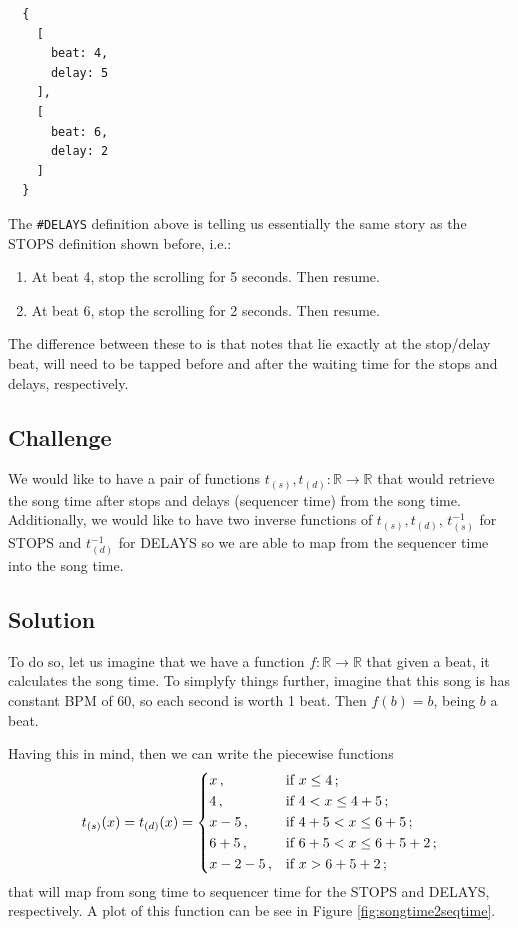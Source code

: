 \documentclass[a4paper,9pt]{article}
\begin{document}
    \begin{verbatim}
  {
    [
      beat: 4,
      delay: 5 
    ],
    [
      beat: 6,
      delay: 2 
    ]
  }
    \end{verbatim}
    The \texttt{\#DELAYS} definition above is telling us essentially the same story as the STOPS definition shown before, i.e.: 
    \begin{enumerate}
	    \item At beat 4, stop the scrolling for 5 seconds. Then resume.
	    \item At beat 6, stop the scrolling for 2 seconds. Then resume.
    \end{enumerate}

    The difference between these to is that notes that lie exactly at the stop/delay beat, will need to be tapped before and after the waiting time for the stops and delays, respectively.
    \subsection{Challenge}

    We would like to have a pair of functions $ t_{(s)}, t_{(d)}: \mathbb{R} \rightarrow \mathbb{R} $ that would retrieve the song time after stops and delays (sequencer time) from the song time. Additionally, we would like to have two inverse functions of $ t_{(s)}, t_{(d)} $, $ t^{-1}_{(s)} $ for STOPS and $ t^{-1}_{(d)} $ for DELAYS so we are able to map from the sequencer time into the song time.


    \subsection{Solution}

    To do so, let us imagine that we have a function $ f : \mathbb{R}\rightarrow \mathbb{R}$ that given a beat, it calculates the song time. To simplyfy things further, imagine that this song is has constant BPM of 60, so each second is worth 1 beat. Then $ f(b) = b $, being $ b $ a beat.

    Having this in mind, then we can write the piecewise functions
    \begin{equation}
	    t_{(s)}(x) = t_{(d)}(x) = \begin{dcases}
		    x\,, & \text{if $ x \leq 4 $}\,; \\
		    4\,, & \text{if $4 <  x \leq 4+5 $}\,; \\
		    x-5\,, & \text{if $4 + 5 <  x \leq 6 + 5 $}\,; \\
		    6+5\,, & \text{if $6 + 5 <  x \leq 6 + 5+ 2 $}\,; \\
		    x-2-5\,, & \text{if $ x > 6+5+2 $}\,; \\
	    \end{dcases}
	    \label{l}
    \end{equation}
    that will map from song time to sequencer time for the STOPS and DELAYS, respectively. A plot of this function can be see in Figure \ref{fig:songtime2seqtime}. 
    
\end{document}
